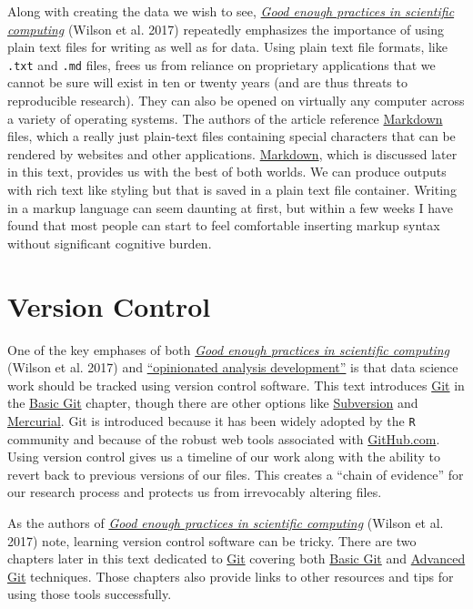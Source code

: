\documentclass[]{book}
\theoremstyle{definition}
\theoremstyle{definition}
\theoremstyle{definition}
\theoremstyle{remark}
\begin{document}
Along with creating the data we wish to see,
\href{http://journals.plos.org/ploscompbiol/article?id=10.1371/journal.pcbi.1005510}{\emph{Good
enough practices in scientific computing}} (Wilson et al. 2017)
repeatedly emphasizes the importance of using plain text files for
writing as well as for data. Using plain text file formats, like
\texttt{.txt} and \texttt{.md} files, frees us from reliance on
proprietary applications that we cannot be sure will exist in ten or
twenty years (and are thus threats to reproducible research). They can
also be opened on virtually any computer across a variety of operating
systems. The authors of the article reference
\protect\hyperlink{markdown}{Markdown} files, which a really just
plain-text files containing special characters that can be rendered by
websites and other applications. \protect\hyperlink{markdown}{Markdown},
which is discussed later in this text, provides us with the best of both
worlds. We can produce outputs with rich text like styling but that is
saved in a plain text file container. Writing in a markup language can
seem daunting at first, but within a few weeks I have found that most
people can start to feel comfortable inserting markup syntax without
significant cognitive burden.

\section{Version Control}\label{version-control}

One of the key emphases of both
\href{http://journals.plos.org/ploscompbiol/article?id=10.1371/journal.pcbi.1005510}{\emph{Good
enough practices in scientific computing}} (Wilson et al. 2017) and
\href{https://peerj.com/preprints/3210/}{``opinionated analysis
development''} is that data science work should be tracked using version
control software. This text introduces \href{https://git-scm.com}{Git}
in the \protect\hyperlink{basic-git}{Basic Git} chapter, though there
are other options like \href{http://subversion.apache.org}{Subversion}
and \href{https://www.mercurial-scm.org}{Mercurial}. Git is introduced
because it has been widely adopted by the \texttt{R} community and
because of the robust web tools associated with
\href{http://github.com}{GitHub.com}. Using version control gives us a
timeline of our work along with the ability to revert back to previous
versions of our files. This creates a ``chain of evidence'' for our
research process and protects us from irrevocably altering files.

As the authors of
\href{http://journals.plos.org/ploscompbiol/article?id=10.1371/journal.pcbi.1005510}{\emph{Good
enough practices in scientific computing}} (Wilson et al. 2017) note,
learning version control software can be tricky. There are two chapters
later in this text dedicated to \href{https://git-scm.com}{Git} covering
both \protect\hyperlink{basic-git}{Basic Git} and
\protect\hyperlink{advanced-git}{Advanced Git} techniques. Those
chapters also provide links to other resources and tips for using those
tools successfully.
\end{document}
